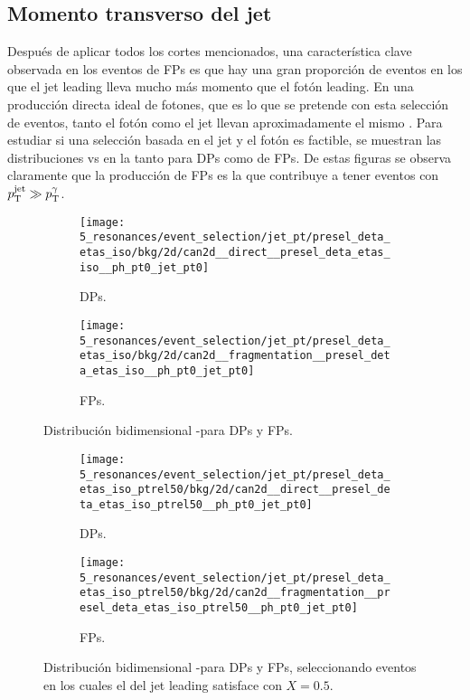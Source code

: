 \subsection{Momento transverso del jet}
\label{subsec:evt_selection:sr_opt:jet_pt}


Después de aplicar todos los cortes mencionados, una característica clave observada en los eventos de \acp{FP} es que hay una gran proporción de eventos en los que el jet leading lleva mucho más momento que el fotón leading. En una producción directa ideal de fotones, que es lo que se pretende con esta selección de eventos, tanto el fotón como el jet llevan aproximadamente el mismo \pt. Para estudiar si una selección basada en el jet y el fotón \pt es factible, se muestran las distribuciones \ptgam vs \ptjet en la \Fig{\ref{fig:evt_selection:sr_opt:jet_pt:ptgam_ptjet}} tanto para \acp{DP} como de \acp{FP}. De estas figuras se observa claramente que la producción de \acp{FP} es la que contribuye a tener eventos con \(p_{\text{T}}^\text{jet} \gg p_{\text{T}}^{\gamma}\).


\begin{figure}[ht!]
    \centering
    \begin{subfigure}[h]{0.49\linewidth}
        \centering
        \texttt{[image: 5\_resonances/event\_selection/jet\_pt/presel\_deta\_etas\_iso/bkg/2d/can2d\_\_direct\_\_presel\_deta\_etas\_iso\_\_ph\_pt0\_jet\_pt0]}
        \caption{\acp{DP}.}
    \end{subfigure}
    \hfill
    \begin{subfigure}[h]{0.49\linewidth}
        \centering
        \texttt{[image: 5\_resonances/event\_selection/jet\_pt/presel\_deta\_etas\_iso/bkg/2d/can2d\_\_fragmentation\_\_presel\_deta\_etas\_iso\_\_ph\_pt0\_jet\_pt0]}
        \caption{\acp{FP}.}
    \end{subfigure}
    \caption{Distribución bidimensional \ptgam-\ptjet para \acp{DP} y \acp{FP}.}
    \label{fig:evt_selection:sr_opt:jet_pt:ptgam_ptjet}
\end{figure}

\begin{figure}[ht!]
    \centering
    \begin{subfigure}[h]{0.49\linewidth}
        \centering
        \texttt{[image: 5\_resonances/event\_selection/jet\_pt/presel\_deta\_etas\_iso\_ptrel50/bkg/2d/can2d\_\_direct\_\_presel\_deta\_etas\_iso\_ptrel50\_\_ph\_pt0\_jet\_pt0]}
        \caption{\acp{DP}.}
    \end{subfigure}
    \hfill
    \begin{subfigure}[h]{0.49\linewidth}
        \centering
        \texttt{[image: 5\_resonances/event\_selection/jet\_pt/presel\_deta\_etas\_iso\_ptrel50/bkg/2d/can2d\_\_fragmentation\_\_presel\_deta\_etas\_iso\_ptrel50\_\_ph\_pt0\_jet\_pt0]}
        \caption{\acp{FP}.}
    \end{subfigure}
    \caption{Distribución bidimensional \ptgam-\ptjet para \acp{DP} y \acp{FP}, seleccionando eventos en los cuales el \pt del jet leading satisface \Eqn{\ref{eq:evt_selection:sr_opt:jet_pt:jet_pt_rel_X}} con \(X=0.5\).}
    \label{fig:evt_selection:sr_opt:jet_pt:ptgam_ptjet_X0.5}
\end{figure}



